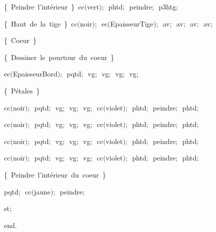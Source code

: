 {\vspace{\neglskip}\mbox{\blc  \blk\blk\idt  \cmt  \{\ Peindre\ l{'}intérieur\ \}\idt \ cc$($vert$)$$;$\ phtd$;$\ peindre$;$\ p3htg$;$\ }\par 
\vspace{\neglskip}\mbox{\blc  \blk\idt  \cmt  \{\ Haut\ de\ la\ tige\ \}\idt \ cc$($noir$)$$;$\ ec$($EpaisseurTige$)$$;$\ av$;$\ av$;$\ av$;$\ av$;$}\par 
\vspace{\neglskip}\mbox{\blc  \blk\idt  \cmt  \{\ Coeur\ \}\idt }\par 
\vspace{\neglskip}\mbox{\blc  \blk\blk\idt  \cmt  \{\ Dessiner\ le\ pourtour\ du\ coeur\ \}\idt }\par 
\vspace{\neglskip}\mbox{\blc  \blk\blk\blk\blk\idt  ec$($EpaisseurBord$)$$;$\ pqtd$;$\ vg$;$\ vg$;$\ vg$;$\ vg$;$}\par 
\vspace{\neglskip}\mbox{\blc  \blk\blk\idt  \cmt  \{\ Pétales\ \}\idt }\par 
\vspace{\neglskip}\mbox{\blc  \blk\blk\blk\blk\idt  cc$($noir$)$$;$\ pqtd$;$\ vg$;$\ vg$;$\ vg$;$\ cc$($violet$)$$;$\ phtd$;$\ peindre$;$\ phtd$;$\ }\par 
\vspace{\neglskip}\mbox{\blc  \blk\blk\blk\blk\idt  cc$($noir$)$$;$\ pqtd$;$\ vg$;$\ vg$;$\ vg$;$\ cc$($violet$)$$;$\ phtd$;$\ peindre$;$\ phtd$;$\ }\par 
\vspace{\neglskip}\mbox{\blc  \blk\blk\blk\blk\idt  cc$($noir$)$$;$\ pqtd$;$\ vg$;$\ vg$;$\ vg$;$\ cc$($violet$)$$;$\ phtd$;$\ peindre$;$\ phtd$;$\ }\par 
\vspace{\neglskip}\mbox{\blc  \blk\blk\blk\blk\idt  cc$($noir$)$$;$\ pqtd$;$\ vg$;$\ vg$;$\ vg$;$\ cc$($violet$)$$;$\ phtd$;$\ peindre$;$\ phtd$;$}\par 
\vspace{\neglskip}\mbox{\blc  \blk\blk\idt  \cmt  \{\ Peindre\ l{'}intérieur\ du\ coeur\ \}\idt }\par 
\vspace{\neglskip}\mbox{\blc  \blk\blk\blk\blk\idt  pqtd$;$\ cc$($jaune$)$$;$\ peindre$;$}\par 
\vspace{\neglskip}\mbox{\blc  \blk\idt  st$;$\ }\par 
\vspace{\neglskip}\mbox{\blc  \idt  \mcl end\idt $.$}\par 

\medskip }

